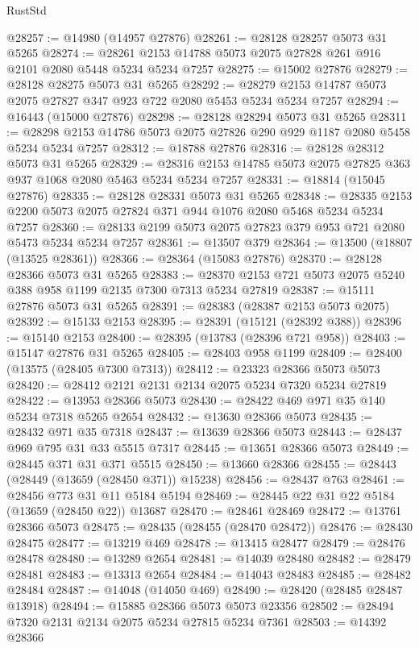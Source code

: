 \begin{lexlean}{RustStd}
\begin{coremodule}
@28257 := @14980 (@14957 @27876)
@28261 := @28128 @28257 @5073 @31 @5265
@28274 := @28261 @2153 @14788 @5073 @2075 @27828 @261 @916 @2101 @2080 @5448 @5234 @5234 @7257
@28275 := @15002 @27876
@28279 := @28128 @28275 @5073 @31 @5265
@28292 := @28279 @2153 @14787 @5073 @2075 @27827 @347 @923 @722 @2080 @5453 @5234 @5234 @7257
@28294 := @16443 (@15000 @27876)
@28298 := @28128 @28294 @5073 @31 @5265
@28311 := @28298 @2153 @14786 @5073 @2075 @27826 @290 @929 @1187 @2080 @5458 @5234 @5234 @7257
@28312 := @18788 @27876
@28316 := @28128 @28312 @5073 @31 @5265
@28329 := @28316 @2153 @14785 @5073 @2075 @27825 @363 @937 @1068 @2080 @5463 @5234 @5234 @7257
@28331 := @18814 (@15045 @27876)
@28335 := @28128 @28331 @5073 @31 @5265
@28348 := @28335 @2153 @2200 @5073 @2075 @27824 @371 @944 @1076 @2080 @5468 @5234 @5234 @7257
@28360 := @28133 @2199 @5073 @2075 @27823 @379 @953 @721 @2080 @5473 @5234 @5234 @7257
@28361 := @13507 @379
@28364 := @13500 (@18807 (@13525 @28361))
@28366 := @28364 (@15083 @27876)
@28370 := @28128 @28366 @5073 @31 @5265
@28383 := @28370 @2153 @721 @5073 @2075 @5240 @388 @958 @1199 @2135 @7300 @7313 @5234 @27819
@28387 := @15111 @27876 @5073 @31 @5265
@28391 := @28383 (@28387 @2153 @5073 @2075)
@28392 := @15133 @2153
@28395 := @28391 (@15121 (@28392 @388))
@28396 := @15140 @2153
@28400 := @28395 (@13783 (@28396 @721 @958))
@28403 := @15147 @27876 @31 @5265
@28405 := @28403 @958 @1199
@28409 := @28400 (@13575 (@28405 @7300 @7313))
@28412 := @23323 @28366 @5073 @5073
@28420 := @28412 @2121 @2131 @2134 @2075 @5234 @7320 @5234 @27819
@28422 := @13953 @28366 @5073
@28430 := @28422 @469 @971 @35 @140 @5234 @7318 @5265 @2654
@28432 := @13630 @28366 @5073
@28435 := @28432 @971 @35 @7318
@28437 := @13639 @28366 @5073
@28443 := @28437 @969 @795 @31 @33 @5515 @7317
@28445 := @13651 @28366 @5073
@28449 := @28445 @371 @31 @371 @5515
@28450 := @13660 @28366
@28455 := @28443 (@28449 (@13659 (@28450 @371)) @15238)
@28456 := @28437 @763
@28461 := @28456 @773 @31 @11 @5184 @5194
@28469 := @28445 @22 @31 @22 @5184 (@13659 (@28450 @22)) @13687
@28470 := @28461 @28469
@28472 := @13761 @28366 @5073
@28475 := @28435 (@28455 (@28470 @28472))
@28476 := @28430 @28475
@28477 := @13219 @469
@28478 := @13415 @28477
@28479 := @28476 @28478
@28480 := @13289 @2654
@28481 := @14039 @28480
@28482 := @28479 @28481
@28483 := @13313 @2654
@28484 := @14043 @28483
@28485 := @28482 @28484
@28487 := @14048 (@14050 @469)
@28490 := @28420 (@28485 @28487 @13918)
@28494 := @15885 @28366 @5073 @5073 @23356
@28502 := @28494 @7320 @2131 @2134 @2075 @5234 @27815 @5234 @7361
@28503 := @14392 @28366

\end{coremodule}
\end{lexlean}
